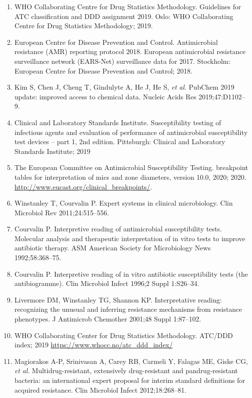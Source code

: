 \documentclass[
]{book}
\begin{document}
\begin{enumerate}
\item
  WHO Collaborating Centre for Drug Statistics Methodology. Guidelines for ATC classification and DDD assignment 2019. Oslo: WHO Collaborating Centre for Drug Statistics Methodology; 2019.
\item
  European Centre for Disease Prevention and Control. Antimicrobial resistance (AMR) reporting protocol 2018. European antimicrobial resistance surveillance network (EARS-Net) surveillance data for 2017. Stockholm: European Centre for Disease Prevention and Control; 2018.
\item
  Kim S, Chen J, Cheng T, Gindulyte A, He J, He S, \emph{et al.} PubChem 2019 update: improved access to chemical data. Nucleic Acids Res 2019;47:D1102--9.
\item
  Clinical and Laboratory Standards Institute. Susceptibility testing of infectious agents and evaluation of performance of antimicrobial susceptibility test devices -- part 1, 2nd edition. Pittsburgh: Clinical and Laboratory Standards Institute; 2019
\item
  The European Committee on Antimicrobial Susceptibility Testing. breakpoint tables for interpretation of mics and zone diameters, version 10.0, 2020; 2020. \url{http://www.eucast.org/clinical_breakpoints/}.
\item
  Winstanley T, Courvalin P. Expert systems in clinical microbiology. Clin Microbiol Rev 2011;24:515--556.
\item
  Courvalin P. Interpretive reading of antimicrobial susceptibility tests. Molecular analysis and therapeutic interpretation of in vitro tests to improve antibiotic therapy. ASM American Society for Microbiology News 1992;58:368--75.
\item
  Courvalin P. Interpretive reading of in vitro antibiotic susceptibility tests (the antibiogramme). Clin Microbiol Infect 1996;2 Suppl 1:S26--34.
\item
  Livermore DM, Winstanley TG, Shannon KP. Interpretative reading: recognizing the unusual and inferring resistance mechanisms from resistance phenotypes. J Antimicrob Chemother 2001;48 Suppl 1:87--102.
\item
  WHO Collaborating Center for Drug Statistics Methodology. ATC/DDD index; 2019 \url{https://www.whocc.no/atc_ddd_index/}
\item
  Magiorakos A-P, Srinivasan A, Carey RB, Carmeli Y, Falagas ME, Giske CG, \emph{et al.} Multidrug-resistant, extensively drug-resistant and pandrug-resistant bacteria: an international expert proposal for interim standard definitions for acquired resistance. Clin Microbiol Infect 2012;18:268--81.

\end{enumerate}
\end{document}
